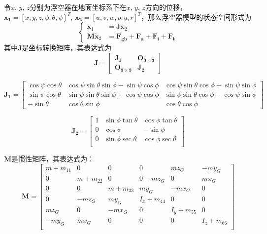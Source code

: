 令$x$, $y$, $z$分别为浮空器在地面坐标系下在$x$, $y$, $z$方向的位移，$\mathbf{x_1}=[x,y,z,\phi,\theta,\psi]^T$, $\mathbf{x_2}=[u,v,w,p,q,r]^T$，那么浮空器模型的状态空间形式为
\begin{equation}\label{eq:model1}
    \begin{cases}
    \dot{\mathbf{x}}_1 &= \mathbf{J}\dot{\mathbf{x}}_2 \\
    \mathbf{M}\dot{\mathbf{x}}_2 &= \mathbf{F_{gb}} + \mathbf{F_a} + \mathbf{F_i} + \mathbf{F_t}
    \end{cases}
\end{equation}
其中$\mathbf{J}$是坐标转换矩阵，其表达式为
\begin{equation}\label{eq:J}
\mathbf{J} = \left[\begin{matrix}
\mathbf{J_1}&\mathbf{O_{3\times3}}  \\
\mathbf{O_{3\times3}}&\mathbf{J_2} 
\end{matrix}\right]
\end{equation}

\begin{equation}\label{eq:J1}
\mathbf{J_1}=\left[
\begin{matrix}
\cos\psi\cos\theta&\cos\psi\sin\theta\sin\phi-\sin\psi\cos\phi&\cos\psi\sin\theta\cos\phi+\sin\psi\sin\phi\\
\sin\psi\cos\theta&\sin\psi\sin\theta\sin\phi+\cos\psi\cos\phi &\sin\psi\sin\theta\cos\phi-\cos\psi\sin\phi \\
-\sin\theta &\cos\theta\sin\phi&\cos\theta\cos\phi
\end{matrix}
\right]
\end{equation}

\begin{equation}\label{eq:J2}
\mathbf{J_2}=\left[
\begin{matrix}
1&\sin\phi\tan\theta&\cos\phi\tan\theta  \\
0&\cos\phi&-\sin\phi  \\
0&\sin\phi\sec\theta&\cos\phi\sec\theta  \\
\end{matrix}
\right]
\end{equation}

$\mathbf{M}$是惯性矩阵，其表达式为：
\begin{equation}\label{eq:M}
\mathbf{M}=\left[
\begin{matrix}
m+m_{11}&0&0&0&mz_G&-my_G  \\
0&m+m_{22}&0&0-mz_G&0&mx_G  \\
0&0&m+m_{33}&my_G&-mx_G&0  \\
0&-mz_G&my_G&I_x+m_{44}&0&0  \\
mz_G&0&-mx_G&0&I_y+m_{55}&0  \\
-my_G&mx_G&0&0&0&I_z+m_{66}  \\
\end{matrix}
\right]
\end{equation}

